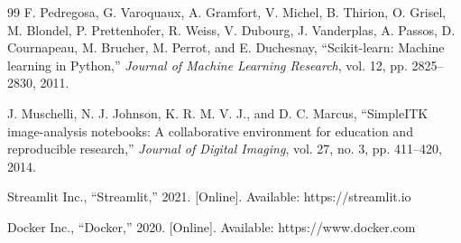 \begin{thebibliography}{99}
 F. Pedregosa, G. Varoquaux, A. Gramfort, V. Michel, B. Thirion, O. Grisel, M. Blondel, P. Prettenhofer, R. Weiss, V. Dubourg, J. Vanderplas, A. Passos, D. Cournapeau, M. Brucher, M. Perrot, and E. Duchesnay, ``Scikit-learn: Machine learning in Python,'' \emph{Journal of Machine Learning Research}, vol. 12, pp. 2825--2830, 2011.

 J. Muschelli, N. J. Johnson, K. R. M. V. J., and D. C. Marcus, ``SimpleITK image-analysis notebooks: A collaborative environment for education and reproducible research,'' \emph{Journal of Digital Imaging}, vol. 27, no. 3, pp. 411--420, 2014.

 Streamlit Inc., ``Streamlit,'' 2021. [Online]. Available: https://streamlit.io

 Docker Inc., ``Docker,'' 2020. [Online]. Available: https://www.docker.com
\end{thebibliography}
